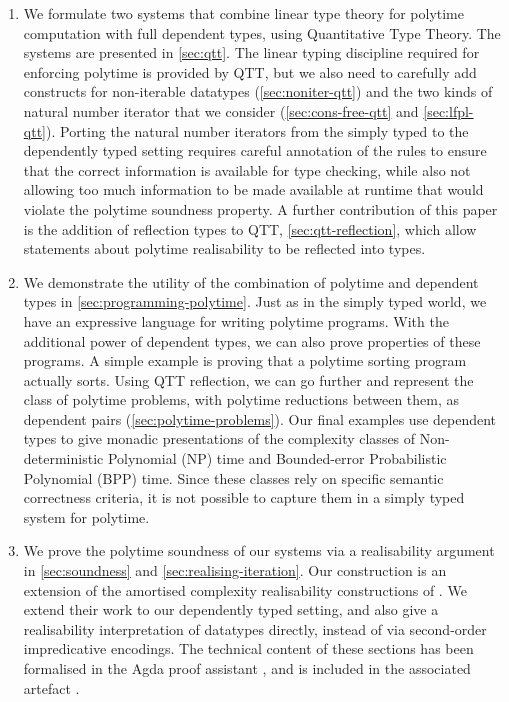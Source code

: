 \documentclass[acmsmall,screen]{acmart}
\begin{document}
\begin{enumerate}
\item We formulate two systems that combine linear type theory for
  polytime computation with full dependent types, using Quantitative
  Type Theory. The systems are presented in \autoref{sec:qtt}. The
  linear typing discipline required for enforcing polytime is provided
  by QTT, but we also need to carefully add constructs for
  non-iterable datatypes (\autoref{sec:noniter-qtt}) and the two kinds
  of natural number iterator that we consider
  (\autoref{sec:cons-free-qtt} and \autoref{sec:lfpl-qtt}). Porting
  the natural number iterators from the simply typed to the
  dependently typed setting requires careful annotation of the rules
  to ensure that the correct information is available for type
  checking, while also not allowing too much information to be made
  available at runtime that would violate the polytime soundness
  property. A further contribution of this paper is the addition of
  reflection types to QTT, \autoref{sec:qtt-reflection}, which allow
  statements about polytime realisability to be reflected into
  types.
\item We demonstrate the utility of the combination of polytime and
  dependent types in \autoref{sec:programming-polytime}. Just as in
  the simply typed world, we have an expressive language for writing
  polytime programs. With the additional power of dependent types, we
  can also prove properties of these programs. A simple example is
  proving that a polytime sorting program actually sorts. Using QTT reflection,
  we can go further and represent the class of polytime problems, with
  polytime reductions between them, as dependent pairs
  (\autoref{sec:polytime-problems}). Our final examples use dependent
  types to give monadic presentations of the complexity classes of
  Non-deterministic Polynomial (NP) time and Bounded-error
  Probabilistic Polynomial (BPP) time. Since these classes rely on
  specific semantic correctness criteria, it is not possible to capture them in
  a simply typed system for polytime.
\item We prove the polytime soundness of our systems via a
  realisability argument in \autoref{sec:soundness} and
  \autoref{sec:realising-iteration}. Our construction is an extension
  of the amortised complexity realisability constructions of
  \citet{dallago11realisability}. We extend their work to our
  dependently typed setting, and also give a realisability
  interpretation of datatypes directly, instead of via second-order
  impredicative encodings. The technical content of these sections has
  been formalised in the Agda proof assistant
  \cite{norell2008dependently}, and is included in the associated
  artefact \cite{atkey2023polydep-artefact}.
\end{enumerate}
\end{document}
